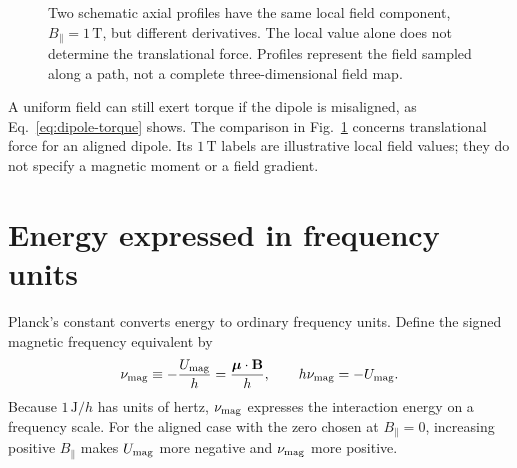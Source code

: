 \documentclass[12pt]{article}
\begin{document}
\begin{figure}[ht]
  \centering
  \caption{Two schematic axial profiles have the same local field component, $B_{\parallel}=1\,\mathrm T$, but different derivatives. The local value alone does not determine the translational force. Profiles represent the field sampled along a path, not a complete three-dimensional field map.}
  \label{fig:field-value-gradient}
\end{figure}

A uniform field can still exert torque if the dipole is misaligned, as Eq.~\eqref{eq:dipole-torque} shows. The comparison in Fig.~\ref{fig:field-value-gradient} concerns translational force for an aligned dipole. Its $1\,\mathrm T$ labels are illustrative local field values; they do not specify a magnetic moment or a field gradient.

\section{Energy expressed in frequency units}
\label{sec:frequency}

Planck's constant converts energy to ordinary frequency units. Define the signed magnetic frequency equivalent by
\begin{equation}
  \nu_{\rm mag}
  \equiv-\frac{U_{\rm mag}}{h}
  =\frac{\boldsymbol{\mu}\cdot\mathbf B}{h},
  \qquad
  h\nu_{\rm mag}=-U_{\rm mag}.
  \label{eq:mag-frequency}
\end{equation}
Because $1\,\mathrm{J}/h$ has units of hertz, $\nu_{\rm mag}$ expresses the interaction energy on a frequency scale. For the aligned case with the zero chosen at $B_{\parallel}=0$, increasing positive $B_{\parallel}$ makes $U_{\rm mag}$ more negative and $\nu_{\rm mag}$ more positive.
\end{document}
